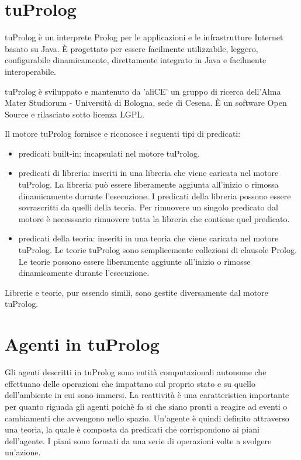 \documentclass[12pt,a4paper,openright,twoside]{report}
\begin{document}
\section{tuProlog}
tuProlog \`e un interprete Prolog per le applicazioni e le infrastrutture Internet basato su Java. \`E progettato per essere facilmente utilizzabile, leggero, configurabile dinamicamente, direttamente integrato in Java e facilmente interoperabile.

tuProlog \`e sviluppato e mantenuto da 'aliCE' un gruppo di ricerca dell'Alma Mater Studiorum - Universit\`a di Bologna, sede di Cesena. \`E un software Open Source e rilasciato sotto licenza LGPL.

Il motore tuProlog fornisce e riconosce i seguenti tipi di predicati:
\begin{itemize}
  \item predicati built-in: incapsulati nel motore tuProlog.
  \item predicati di libreria: inseriti in una libreria che viene caricata nel motore tuProlog. La libreria pu\`o essere liberamente aggiunta all'inizio o rimossa dinamicamente durante l'esecuzione. I predicati della libreria possono essere sovrascritti da quelli della teoria. Per rimuovere un singolo predicato dal motore \`e necesssario rimuovere tutta la libreria che contiene quel predicato.
  \item predicati della teoria: inseriti in una teoria che viene caricata nel motore tuProlog. Le teorie tuProlog sono semplicemente collezioni di clausole Prolog. Le teorie possono essere liberamente aggiunte all'inizio o rimosse dinamicamente durante l'esecuzione.
\end{itemize}

Librerie e teorie, pur essendo simili, sono gestite diversamente dal motore tuProlog.

\section{Agenti in tuProlog}
Gli agenti descritti in tuProlog sono entit\`a computazionali autonome che effettuano delle operazioni che impattano sul proprio stato e su quello dell'ambiente in cui sono immersi. La reattivit\`a \`e una caratteristica importante per quanto riguada gli agenti poich\`e fa si che siano pronti a reagire ad eventi o cambiamenti che avvengono nello spazio.
Un'agente \`e quindi definito attraverso una teoria, la quale \`e composta da predicati che corrispondono ai piani dell'agente. I piani sono formati da una serie di operazioni volte a svolgere un'azione.
\end{document}
